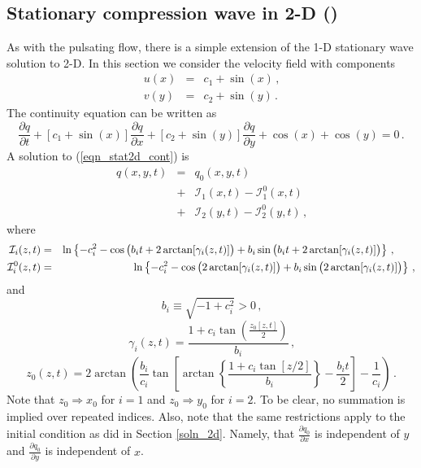 \documentclass[11pt]{book}
\begin{document}
\subsection{Stationary compression wave in 2-D (\texorpdfstring{}{compression_wave})}
\label{stationary_2d}

As with the pulsating flow, there is a simple extension of the 1-D stationary wave solution to 2-D.  In this section we consider the velocity field with components
\begin{eqnarray}
u(x) &=& c_1 + \sin(x) \,\mbox{,} \\
v(y) &=& c_2 + \sin(y) \,\mbox{.}
\end{eqnarray}
The continuity equation can be written as
\begin{equation}
\label{eqn_stat2d_cont}
\frac{\partial q}{\partial t} + [c_1 + \sin(x)] \frac{\partial q}{\partial x} + [c_2 + \sin(y)] \frac{\partial q}{\partial y} + \cos(x) + \cos(y) = 0 \,\mbox{.}
\end{equation}
A solution to (\ref{eqn_stat2d_cont}) is
\begin{eqnarray}
\label{eqn_stat2d_soln}
q(x,y,t) &=& q_0(x,y,t) \nonumber\\
&+& \mathcal{I}_1(x,t) - \mathcal{I}_1^0(x,t) \nonumber\\
&+& \mathcal{I}_2(y,t) - \mathcal{I}_2^0(y,t) \,\mbox{,}
\end{eqnarray}
where
\begin{eqnarray}
\label{eqn_Ii}
\mathcal{I}_i(z,t) &=& \ln\left\{ -c_i^2 - \cos\big(b_i t + 2\arctan[\gamma_i(z,t)] \big) + b_i \sin\big(b_i t + 2\arctan[\gamma_i(z,t)] \big) \right\}\,\mbox{,} \quad\quad  \vspace{0.3cm}\\
\label{eqn_Ii0}
\mathcal{I}_i^0(z,t) &=& \ln\left\{ -c_i^2 - \cos\big(2\arctan[\gamma_i(z,t)] \big) + b_i \sin\big(2\arctan[\gamma_i(z,t)] \big) \right\} \,\mbox{,}
\end{eqnarray}
and
\begin{equation}
b_i \equiv \sqrt{-1 + c_i^2} >0 \,\mbox{,}
\end{equation}
\begin{equation}
\gamma_i(z,t) = \frac{ 1 + c_i \tan\left( \frac{z_0[z,t]}{2} \right) }{b_i} \,\mbox{,}
\end{equation}
\begin{equation}
z_0(z,t) = 2\arctan\left( \frac{b_i}{c_i} \tan \left[ \arctan\left\{ \frac{1+c_i\tan[z/2]}{b_i} \right\} - \frac{b_it}{2} \right] - \frac{1}{c_i} \right) \,\mbox{.}
\end{equation}
Note that $z_0 \Rightarrow x_0$ for $i=1$ and $z_0 \Rightarrow y_0$ for $i=2$.  To be clear, no summation is implied over repeated indices. Also, note that the same restrictions apply to the initial condition as did in Section \ref{soln_2d}. Namely, that $\frac{\partial q_0}{\partial x}$ is independent of $y$ and $\frac{\partial q_0}{\partial y}$ is independent of $x$.
\end{document}
